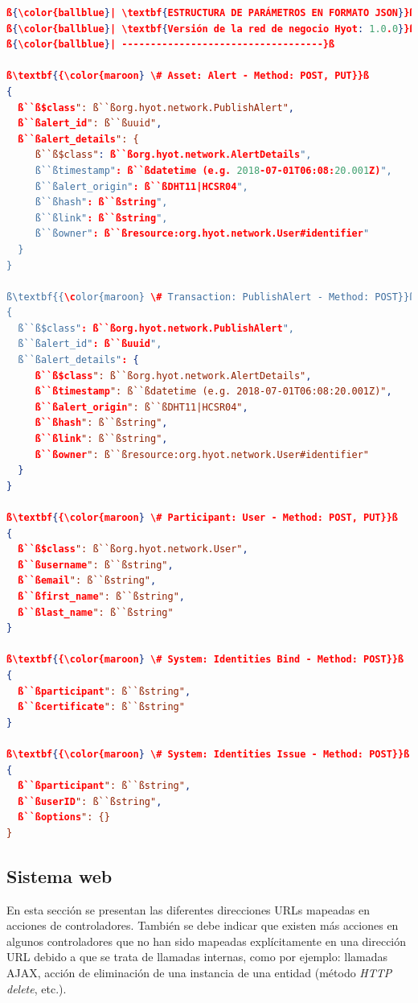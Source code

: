 \documentclass[12pt,a4paper, twoside]{report}
\begin{document}
\begin{lstlisting}[language=json, basicstyle=\ttfamily\footnotesize, numbers=none, escapechar=ß]
ß{\color{ballblue}| \textbf{ESTRUCTURA DE PARÁMETROS EN FORMATO JSON}}ß
ß{\color{ballblue}| \textbf{Versión de la red de negocio Hyot: 1.0.0}}ß
ß{\color{ballblue}| -----------------------------------}ß

ß\textbf{{\color{maroon} \# Asset: Alert - Method: POST, PUT}}ß
{
  ß``ß$class": ß``ßorg.hyot.network.PublishAlert",
  ß``ßalert_id": ß``ßuuid",
  ß``ßalert_details": {
     ß``ß$class": ß``ßorg.hyot.network.AlertDetails",
     ß``ßtimestamp": ß``ßdatetime (e.g. 2018-07-01T06:08:20.001Z)",
     ß``ßalert_origin": ß``ßDHT11|HCSR04",
     ß``ßhash": ß``ßstring",
     ß``ßlink": ß``ßstring",
     ß``ßowner": ß``ßresource:org.hyot.network.User#identifier"
  }
}

ß\textbf{{\color{maroon} \# Transaction: PublishAlert - Method: POST}}ß
{
  ß``ß$class": ß``ßorg.hyot.network.PublishAlert",
  ß``ßalert_id": ß``ßuuid",
  ß``ßalert_details": {
     ß``ß$class": ß``ßorg.hyot.network.AlertDetails",
     ß``ßtimestamp": ß``ßdatetime (e.g. 2018-07-01T06:08:20.001Z)",
     ß``ßalert_origin": ß``ßDHT11|HCSR04",
     ß``ßhash": ß``ßstring",
     ß``ßlink": ß``ßstring",
     ß``ßowner": ß``ßresource:org.hyot.network.User#identifier"
  }
}
            
ß\textbf{{\color{maroon} \# Participant: User - Method: POST, PUT}}ß
{
  ß``ß$class": ß``ßorg.hyot.network.User",
  ß``ßusername": ß``ßstring",
  ß``ßemail": ß``ßstring",
  ß``ßfirst_name": ß``ßstring",
  ß``ßlast_name": ß``ßstring"
}

ß\textbf{{\color{maroon} \# System: Identities Bind - Method: POST}}ß
{
  ß``ßparticipant": ß``ßstring",
  ß``ßcertificate": ß``ßstring"
}

ß\textbf{{\color{maroon} \# System: Identities Issue - Method: POST}}ß
{
  ß``ßparticipant": ß``ßstring",
  ß``ßuserID": ß``ßstring",
  ß``ßoptions": {}
}

\end{lstlisting}

	\subsection{Sistema web}
	
	En esta sección se presentan las diferentes direcciones URLs mapeadas en acciones de controladores. También se debe indicar que existen más acciones en algunos controladores que no han sido mapeadas explícitamente en una dirección URL debido a que se trata de llamadas internas, como por ejemplo: llamadas AJAX, acción de eliminación de una instancia de una entidad (método \textit{HTTP delete}, etc.). \\
		
\end{document}
